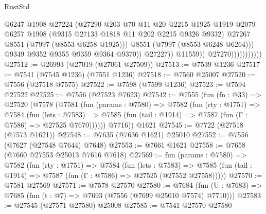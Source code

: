 \begin{lexlean}{RustStd}
\begin{coremodule}
                                        @6247
                                        @1908
                                        @27224
                                        (@27290
                                          @203
                                          @70
                                          @11
                                          @20
                                          @2215
                                          @1925
                                          @1919
                                          @2079
                                          @6257
                                          @1908
                                          (@9315 @27133 @1818 @11 @202 @2215 @9326 @9332)
                                          @27267
                                          @8551
                                          (@7997 (@8553 @6258 @1925)))
                                        @8551
                                        (@7997 (@8553 @6248 @6264)))
                                      @9349
                                      @9352
                                      @9355
                                      @9359
                                      @9364
                                      @9370))
                                  @27227))
                              @11559))
                          @27270)))))))))))
@27512 := @26993 (@27019 (@27061 @27509))
@27513 := @7539 @1236
@27517 := @7541 (@7545 @1236) (@7551 @1236)
@27518 := @7560 @25007
@27520 := @7556 (@27518 @7575)
@27522 := @7598 (@7599 @1236)
@27523 := @7594 @27522
@27525 := @7556 (@27523 @7623)
@27542 := @7555
    (fun (fn : @33) =>
    @27520
      (@7578
        (@7581
          (fun (params : @7580) =>
          @7582
            (fun (rty : @1751) =>
            @7584
              (fun (lets : @7583) =>
              @7585 (fun (tail : @1914) => @7587 (fun (Γ : @7586) => @27525 @7670))))))
        @7716))
    @1621
@27545 := @7722 (@27518 (@7573 @1621))
@27548 := @7635 (@7636 @1621) @25010
@27552 := @7556 (@7627 (@27548 @7644) @7648)
@27553 := @7661 @1621
@27558 := @7658 (@7660 @27553 @25013 @7616 @7618)
@27569 := fun (params : @7580) =>
  @7582
    (fun (rty : @1751) =>
    @7584
      (fun (lets : @7583) =>
      @7585 (fun (tail : @1914) => @7587 (fun (Γ : @7586) => @27525 (@27552 @27558)))))
@27570 := @7581 @27569
@27571 := @7578 @27570
@27580 := @7684
    (fun (U : @7683) => @7685 (fun (t : @7) => @7693 (@7556 (@7699 @25010 @7574) @7710)))
@27583 := @27545 (@27571 @27580) @25008
@27585 := @7541 @27570 @27580

\end{coremodule}
\end{lexlean}
